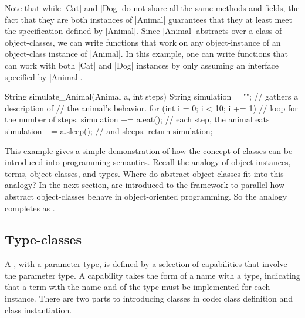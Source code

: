 Note that while \code|Cat| and \code|Dog| do not share all the same methods and fields, the fact that they are both instances of \code|Animal| guarantees that they at least meet the specification defined by \code|Animal|.
Since \code|Animal| abstracts over a class of object-classes, we can write functions that work on any object-instance of an object-class instance of \code|Animal|.
In this example, one can write functions that can work with both \code|Cat| and \code|Dog| instances by only assuming an interface specified by \code|Animal|.
\begin{snippet-Java}
String simulate_Animal(Animal a, int steps) {
  String simulation = "";           // gathers a description of
                                    // the animal's behavior.
  for (int i = 0; i < 10; i += 1) { // loop for the number of steps.
    simulation += a.eat();          // each step, the animal eats
    simulation += a.sleep();        // and sleeps.
  }
  return simulation;
}
\end{snippet-Java}


This example gives a simple demonstration of how the concept of classes can be introduced into programming semantics.
Recall the analogy of object-instances, terms, object-classes, and types.
Where do abstract object-classes fit into this analogy?
In the next section,  are introduced to the \LangA framework to parallel how abstract object-classes behave in object-oriented programming.
So the analogy completes as .

\subsection{Type-classes}

A , with a parameter type, is defined by a selection of capabilities that involve the parameter type.
A capability takes the form of a name with a type, indicating that a term with the name and of the type must be implemented for each instance.
There are two parts to introducing classes in code: class definition and class instantiation.

